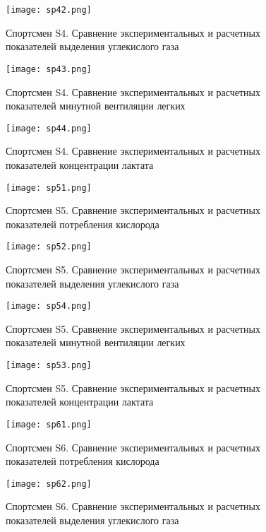 \begin{figure}[!ht]
	\centering
	\texttt{[image: sp42.png]}
	\caption{Спортсмен S4. Сравнение экспериментальных и расчетных показателей выделения углекислого газа} 
\end{figure}

\begin{figure}[!ht]
	\centering
	\texttt{[image: sp43.png]}
	\caption{Спортсмен S4. Сравнение экспериментальных и расчетных показателей минутной вентиляции легких} 
\end{figure}

\begin{figure}[!ht]
	\centering
	\texttt{[image: sp44.png]}
	\caption{Спортсмен S4. Сравнение экспериментальных и расчетных показателей концентрации лактата} 
\end{figure}

\begin{figure}[!ht]
	\centering
	\texttt{[image: sp51.png]}
	\caption{Спортсмен S5. Сравнение экспериментальных и расчетных показателей потребления кислорода } 
\end{figure}

\begin{figure}[!ht]
	\centering
	\texttt{[image: sp52.png]}
	\caption{Спортсмен S5. Сравнение экспериментальных и расчетных показателей выделения углекислого газа} 
\end{figure}

\begin{figure}[!ht]
	\centering
	\texttt{[image: sp54.png]}
	\caption{Спортсмен S5. Сравнение экспериментальных и расчетных показателей минутной вентиляции легких} 
\end{figure}

\begin{figure}[!ht]
	\centering
	\texttt{[image: sp53.png]}
	\caption{Спортсмен S5. Сравнение экспериментальных и расчетных показателей концентрации лактата} 
\end{figure}

\begin{figure}[!ht]
	\centering
	\texttt{[image: sp61.png]}
	\caption{Спортсмен S6. Сравнение экспериментальных и расчетных показателей потребления кислорода } 
\end{figure}

\begin{figure}[!ht]
	\centering
	\texttt{[image: sp62.png]}
	\caption{Спортсмен S6. Сравнение экспериментальных и расчетных показателей выделения углекислого газа} 
\end{figure}

